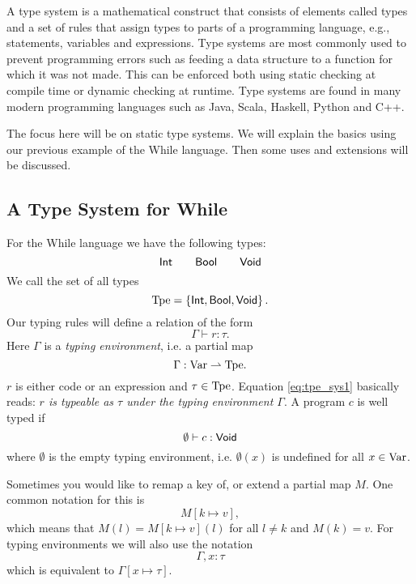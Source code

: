 A type system is a mathematical construct that consists of elements called types
and a set of rules that assign types to parts of a programming language, e.g.,
statements, variables and expressions. Type systems are most commonly used to
prevent programming errors such as feeding a data structure to a function for
which it was not made. This can be enforced both using static checking at
compile time or dynamic checking at runtime. Type systems are found in many
modern programming languages such as Java, Scala, Haskell, Python and C++.

The focus here will be on static type systems. We will explain the basics using
our previous example of the While language. Then some uses and extensions will be
discussed.

\subsection{A Type System for While}
\label{sub:a_type_system_for_while}

For the While language we have the following types:
\begin{equation*}
  \mbox{$\mathsf{Int}$} \quad\quad \mbox{$\mathsf{Bool}$} \quad\quad \mbox{$\mathsf{Void}$}
\end{equation*}
We call the set of all types 
\begin{equation*}
  \mbox{$\mathrm{Tpe}$} = \left\{ \mbox{$\mathsf{Int}$}, \mbox{$\mathsf{Bool}$}, \mbox{$\mathsf{Void}$} \right\}.
\end{equation*}
Our typing rules will define a relation of the form
\begin{equation} \label{eq:tpe_sys1}
  \Gamma \vdash r : \tau.
\end{equation}
Here $\Gamma$ is a \emph{typing environment}, i.e. a partial map
\begin{equation*}
  \Gamma: \mbox{$\mathrm{Var}$} \rightharpoonup \mbox{$\mathrm{Tpe}$}.
\end{equation*}
$r$ is either code or an expression and $\tau \in \mbox{$\mathrm{Tpe}$}$.
Equation \eqref{eq:tpe_sys1} basically reads: {\it $r$ is typeable as $\tau$ under the
typing environment $\Gamma$}. A program $c$ is well typed if
\begin{equation*}
  \emptyset \vdash c : \mbox{$\mathsf{Void}$}
\end{equation*}
where $\emptyset$ is the empty typing environment, i.e. $\emptyset(x)$ is
undefined for all $x \in \mbox{$\mathrm{Var}$}$.

\begin{notation}
  Sometimes you would like to remap a key of, or extend a partial map $M$. One
  common notation
  for this is 
  \begin{equation*}
    M[k \mapsto v],
  \end{equation*}
  which means that $M(l) = M[k \mapsto v](l)$ for all $l \neq k$ and
  $M(k) = v$.
  For typing environments we will also use the notation
  \begin{equation*}
    \Gamma, x: \tau
  \end{equation*}
  which is equivalent to $\Gamma[x \mapsto \tau]$.
\end{notation}

